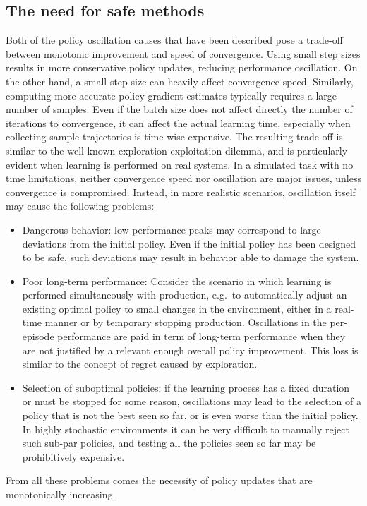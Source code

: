 \subsection{The need for safe methods}
Both of the policy oscillation causes that have been described pose a trade-off between monotonic improvement and speed of convergence. Using small step sizes results in more conservative policy updates, reducing performance oscillation. On the other hand, a small step size can heavily affect convergence speed. Similarly, computing more accurate policy gradient estimates typically requires a large number of samples. Even if the batch size does not affect directly the number of iterations to convergence, it can affect the actual learning time, especially when collecting sample trajectories is time-wise expensive. The resulting trade-off is similar to the well known exploration-exploitation dilemma, and is particularly evident when learning is performed on real systems. In a simulated task with no time limitations, neither convergence speed nor oscillation are major issues, unless convergence is compromised. Instead, in more realistic scenarios, oscillation itself may cause the following problems:
\begin{itemize}
\item Dangerous behavior: low performance peaks may correspond to large deviations from the initial policy. Even if the initial policy has been designed to be safe, such deviations may result in behavior able to damage the system.
\item Poor long-term performance: Consider the scenario in which learning is performed simultaneously with production, e.g.\ to automatically adjust an existing optimal policy to small changes in the environment, either in a real-time manner or by temporary stopping production. Oscillations in the per-episode performance are paid in term of long-term performance when they are not justified by a relevant enough overall policy improvement. This loss is similar to the concept of regret caused by exploration.
\item Selection of suboptimal policies: if the learning process has a fixed duration or must be stopped for some reason, oscillations may lead to the selection of a policy that is not the best seen so far, or is even worse than the initial policy. In highly stochastic environments it can be very difficult to manually reject such sub-par policies, and testing all the policies seen so far may be prohibitively expensive.
\end{itemize} 
From all these problems comes the necessity of policy updates that are monotonically increasing.


